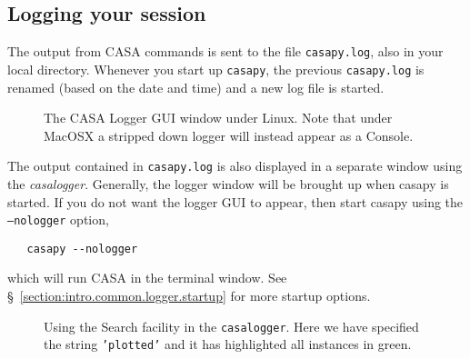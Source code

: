 \subsection{Logging your session}
\label{section:intro.common.logger}

The output from CASA commands is sent to the file {\tt casapy.log},
also in your local directory.  Whenever you start up {\tt casapy}, the previous
{\tt casapy.log} is renamed (based on the date and time) and a new log
file is started.


\begin{figure}[h!]
\begin{center}
\caption{\label{fig:casalogger1} The CASA Logger GUI window under
Linux. Note that under MacOSX a stripped down logger will instead
appear as a Console.}
\hrulefill
\end{center}
\end{figure}

The output contained in {\tt casapy.log} is also displayed in a
separate window using the {\it casalogger}.  Generally,
the logger window will be brought up when casapy is started.  If you
do not want the logger GUI to appear, then start casapy using the 
{\tt --nologger} option,
\small
\begin{verbatim}
   casapy --nologger
\end{verbatim}
\normalsize
which will run CASA in the terminal window.  See \S~\ref{section:intro.common.logger.startup}
for more startup options.


\begin{figure}[h]
\begin{center}
\caption{\label{fig:logger_search} Using the Search facility in the
{\tt casalogger}.  Here we have specified the string {\tt 'plotted'}
and it has highlighted all instances in green.}
\hrulefill
\end{center}
\end{figure}

